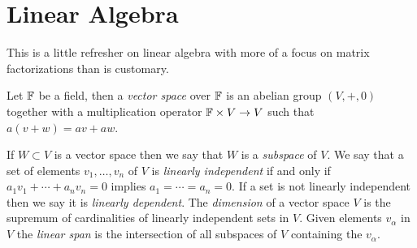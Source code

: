 \section{Linear Algebra}

This is a little refresher on linear algebra with more of a focus on
matrix factorizations than is customary.

\begin{defn}Let $\mathbb{F}$ be a field, then a \emph{vector space} over $\mathbb{F}$ is an abelian group $(V,+,0)$ together with 
a multiplication operator $\mathbb{F} \times V \to V$ such that $a (v + w) = av + aw$.
\end{defn}

\begin{defn}If $W \subset V$ is a vector space then we say that $W$ is a \emph{subspace} of $V$.  We say that a set of elements  $v_1, \dotsc, v_n$ of $V$ is \emph{linearly independent} if and only if $a_1 v_1 + \dotsb + a_n v_n = 0$ implies
$a_1 = \dotsb = a_n = 0$.  If a set is not linearly independent then we say it is  \emph{linearly dependent}.  The \emph{dimension} of a vector space $V$ is the supremum of cardinalities of linearly independent sets in $V$.  Given elements $v_\alpha$ in $V$ the \emph{linear span} is the intersection of all subspaces of $V$ containing the $v_\alpha$.  
\end{defn}

